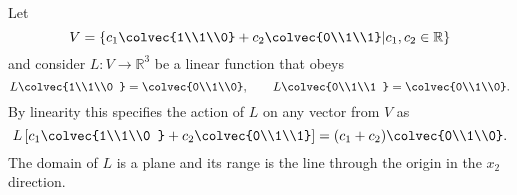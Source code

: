 \begin{example}\label{Vdef} Let \[V=\left\{  c_1\colvec{1\\1\\0} +c_2\colvec{0\\1\\1} \middle| c_1,c_2\in \mathbb{R} \right\} \] and consider $L:V\to \mathbb{R}^3$ be a linear function that obeys 
\[
L\colvec{1\\1\\0 } = \colvec{0\\1\\0},\qquad
L\colvec{0\\1\\1 } = \colvec{0\\1\\0}.
\]
By linearity this specifies the action of $L$ on any vector from $V$ as
\[
L\left[ c_1\colvec{1\\1\\0 } + c_2 \colvec{0\\1\\1} \right]= (c_1+c_2)\colvec{0\\1\\0}.
\]
The domain of $L$ is a plane and its range is the line through the origin in the $x_2$ direction. 



\end{example}
